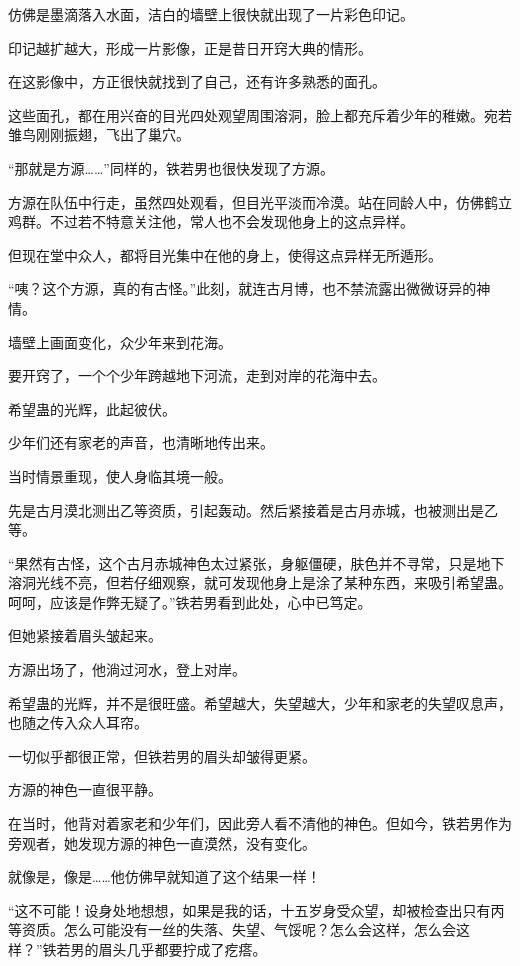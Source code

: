\begin{this_body}
仿佛是墨滴落入水面，洁白的墙壁上很快就出现了一片彩色印记。

印记越扩越大，形成一片影像，正是昔日开窍大典的情形。

在这影像中，方正很快就找到了自己，还有许多熟悉的面孔。

这些面孔，都在用兴奋的目光四处观望周围溶洞，脸上都充斥着少年的稚嫩。宛若雏鸟刚刚振翅，飞出了巢穴。

“那就是方源……”同样的，铁若男也很快发现了方源。

方源在队伍中行走，虽然四处观看，但目光平淡而冷漠。站在同龄人中，仿佛鹤立鸡群。不过若不特意关注他，常人也不会发现他身上的这点异样。

但现在堂中众人，都将目光集中在他的身上，使得这点异样无所遁形。

“咦？这个方源，真的有古怪。”此刻，就连古月博，也不禁流露出微微讶异的神情。

墙壁上画面变化，众少年来到花海。

要开窍了，一个个少年跨越地下河流，走到对岸的花海中去。

希望蛊的光辉，此起彼伏。

少年们还有家老的声音，也清晰地传出来。

当时情景重现，使人身临其境一般。

先是古月漠北测出乙等资质，引起轰动。然后紧接着是古月赤城，也被测出是乙等。

“果然有古怪，这个古月赤城神色太过紧张，身躯僵硬，肤色并不寻常，只是地下溶洞光线不亮，但若仔细观察，就可发现他身上是涂了某种东西，来吸引希望蛊。呵呵，应该是作弊无疑了。”铁若男看到此处，心中已笃定。

但她紧接着眉头皱起来。

方源出场了，他淌过河水，登上对岸。

希望蛊的光辉，并不是很旺盛。希望越大，失望越大，少年和家老的失望叹息声，也随之传入众人耳帘。

一切似乎都很正常，但铁若男的眉头却皱得更紧。

方源的神色一直很平静。

在当时，他背对着家老和少年们，因此旁人看不清他的神色。但如今，铁若男作为旁观者，她发现方源的神色一直漠然，没有变化。

就像是，像是……他仿佛早就知道了这个结果一样！

“这不可能！设身处地想想，如果是我的话，十五岁身受众望，却被检查出只有丙等资质。怎么可能没有一丝的失落、失望、气馁呢？怎么会这样，怎么会这样？”铁若男的眉头几乎都要拧成了疙瘩。


\end{this_body}

